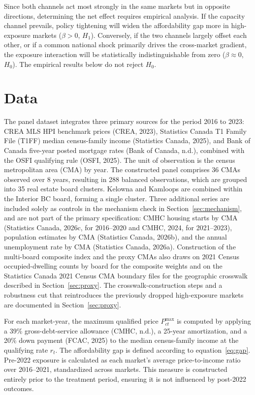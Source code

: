 \documentclass[12pt]{article}
\begin{document}
Since both channels act most strongly in the same markets but in opposite directions, determining the net effect requires empirical analysis. If the capacity channel prevails, policy tightening will widen the affordability gap more in high-exposure markets ($\beta>0$, $H_1$). Conversely, if the two channels largely offset each other, or if a common national shock primarily drives the cross-market gradient, the exposure interaction will be statistically indistinguishable from zero ($\beta\approx 0$, $H_0$). The empirical results below do not reject $H_0$.


\section{Data}
\label{sec:data}

The panel dataset integrates three primary sources for the period 2016 to 2023: CREA MLS HPI benchmark prices (CREA, 2023), Statistics Canada T1 Family File (T1FF) median census-family income (Statistics Canada, 2025), and Bank of Canada five-year posted mortgage rates (Bank of Canada, n.d.), combined with the OSFI qualifying rule (OSFI, 2025). The unit of observation is the census metropolitan area (CMA) by year. The constructed panel comprises 36 CMAs observed over 8 years, resulting in 288 balanced observations, which are grouped into 35 real estate board clusters. Kelowna and Kamloops are combined within the Interior BC board, forming a single cluster. Three additional series are included solely as controls in the mechanism check in Section~\ref{sec:mechanism}, and are not part of the primary specification: CMHC housing starts by CMA (Statistics Canada, 2026c, for 2016--2020 and CMHC, 2024, for 2021--2023), population estimates by CMA (Statistics Canada, 2026b), and the annual unemployment rate by CMA (Statistics Canada, 2026a). Construction of the multi-board composite index and the proxy CMAs also draws on 2021 Census occupied-dwelling counts by board for the composite weights and on the Statistics Canada 2021 Census CMA boundary files for the geographic crosswalk described in Section~\ref{sec:proxy}. The crosswalk-construction steps and a robustness cut that reintroduces the previously dropped high-exposure markets are documented in Section~\ref{sec:proxy}.

For each market-year, the maximum qualified price $P^{\max}_{ct}$ is computed by applying a 39\% gross-debt-service allowance (CMHC, n.d.), a 25-year amortization, and a 20\% down payment (FCAC, 2025) to the median census-family income at the qualifying rate $r_t$. The affordability gap is defined according to equation~\eqref{eq:gap}. Pre-2022 exposure is calculated as each market's average price-to-income ratio over 2016--2021, standardized across markets. This measure is constructed entirely prior to the treatment period, ensuring it is not influenced by post-2022 outcomes.
\end{document}
